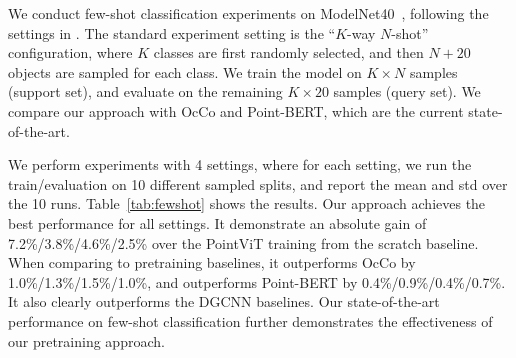 \documentclass[runningheads]{llncs}
\begin{document}
We conduct few-shot classification experiments on ModelNet40~\cite{wu20153d}, following the settings in \cite{yu2021point}.  The standard experiment setting is the ``$K$-way $N$-shot'' configuration, where $K$ classes are first randomly selected, and then $N + 20$ objects are sampled for each class.  We train the model on $K \times N$ samples (support set), and evaluate on the remaining $K \times 20$ samples (query set). We compare our approach with OcCo and Point-BERT, which are the current state-of-the-art.

We perform experiments with 4 settings, where for each setting, we run the train/evaluation on 10 different sampled splits, and report the mean and std over the 10 runs.  Table~\ref{tab:fewshot} shows the results.  Our approach achieves the best performance for all settings.  It demonstrate an absolute gain of 7.2\%/3.8\%/4.6\%/2.5\% over the PointViT training from the scratch baseline.  When comparing to pretraining baselines, it outperforms OcCo by 1.0\%/1.3\%/1.5\%/1.0\%, and outperforms Point-BERT by 0.4\%/0.9\%/0.4\%/0.7\%.  It also clearly outperforms the DGCNN baselines.  Our state-of-the-art performance on few-shot classification further demonstrates the effectiveness of our pretraining approach.
\end{document}
